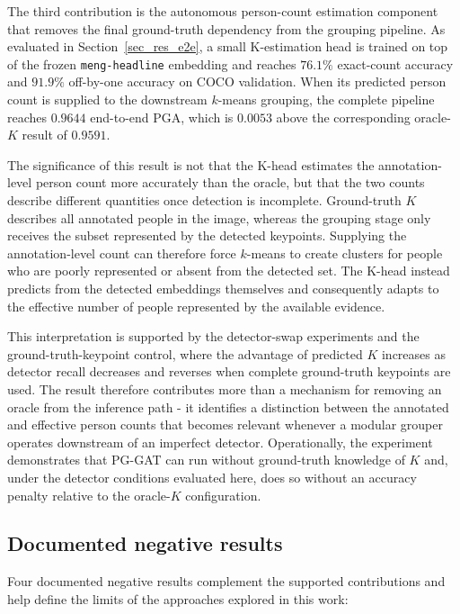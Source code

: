The third contribution is the autonomous person-count estimation
component that removes the final ground-truth dependency from the
grouping pipeline.
As evaluated in Section~\ref{sec_res_e2e}, a small K-estimation head
is trained on top of the frozen \texttt{meng-headline} embedding and
reaches $76.1\%$ exact-count accuracy and $91.9\%$ off-by-one accuracy
on COCO validation.
When its predicted person count is supplied to the downstream $k$-means
grouping, the complete pipeline reaches $0.9644$ end-to-end PGA,
which is $0.0053$ above the corresponding oracle-$K$ result of $0.9591$.

The significance of this result is not that the K-head estimates the
annotation-level person count more accurately than the oracle,
but that the two counts describe different quantities once detection is
incomplete.
Ground-truth $K$ describes all annotated people in the image,
whereas the grouping stage only receives the subset represented by the
detected keypoints.
Supplying the annotation-level count can therefore force $k$-means to
create clusters for people who are poorly represented or absent from the
detected set.
The K-head instead predicts from the detected embeddings themselves and
consequently adapts to the effective number of people represented by the
available evidence.

This interpretation is supported by the detector-swap experiments and
the ground-truth-keypoint control,
where the advantage of predicted $K$ increases as detector recall
decreases and reverses when complete ground-truth keypoints are used.
The result therefore contributes more than a mechanism for removing an
oracle from the inference path -
it identifies a distinction between the annotated and effective person
counts that becomes relevant whenever a modular grouper operates
downstream of an imperfect detector.
Operationally, the experiment demonstrates that PG-GAT can run without
ground-truth knowledge of $K$ and,
under the detector conditions evaluated here, does so without an
accuracy penalty relative to the oracle-$K$ configuration.

\subsection{Documented negative results}
\label{sec_conc_contrib_negatives}

Four documented negative results complement the supported contributions
and help define the limits of the approaches explored in this work:

